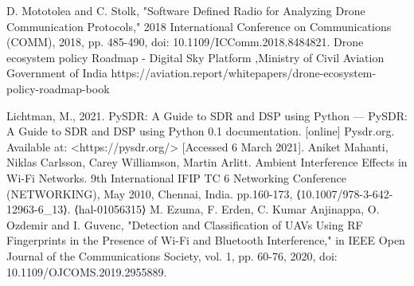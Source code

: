 \begin{thebibliography}{15}
 D. Mototolea and C. Stolk, "Software Defined Radio for Analyzing Drone Communication Protocols," 2018 International Conference on Communications (COMM), 2018, pp. 485-490, doi: 10.1109/ICComm.2018.8484821.
 Drone ecosystem policy Roadmap - Digital Sky Platform ,Ministry of Civil Aviation Government of India https://aviation.report/whitepapers/drone-ecosystem-policy-roadmap-book

 Lichtman, M., 2021. PySDR: A Guide to SDR and DSP using Python — PySDR: A Guide to SDR and DSP using Python 0.1 documentation. [online] Pysdr.org. Available at: <https://pysdr.org/> [Accessed 6 March 2021].
 Aniket Mahanti, Niklas Carlsson, Carey Williamson, Martin Arlitt. Ambient Interference Effects in Wi-Fi Networks. 9th International IFIP TC 6 Networking Conference (NETWORKING), May 2010, Chennai, India. pp.160-173, ⟨10.1007/978-3-642-12963-6\_13⟩. ⟨hal-01056315⟩
M. Ezuma, F. Erden, C. Kumar Anjinappa, O. Ozdemir and I. Guvenc, "Detection and Classification of UAVs Using RF Fingerprints in the Presence of Wi-Fi and Bluetooth Interference," in IEEE Open Journal of the Communications Society, vol. 1, pp. 60-76, 2020, doi: 10.1109/OJCOMS.2019.2955889.
\end{thebibliography}
